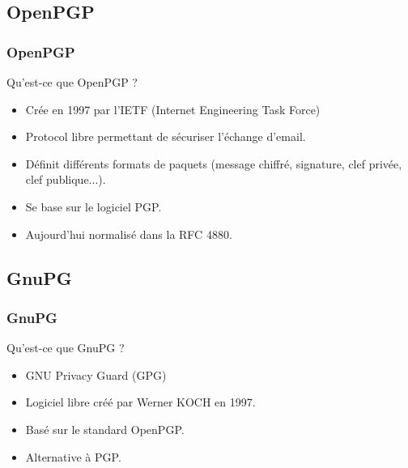 \subsection{OpenPGP}
\begin{frame}
    \frametitle{\color{white}OpenPGP}
    \begin{block}{Qu'est-ce que OpenPGP ?}
      \begin{itemize}
       \item Crée en 1997 par l'IETF (Internet Engineering Task Force)
       \item Protocol libre permettant de sécuriser l'échange d'email.
       \item Définit différents formats de paquets (message chiffré, signature, clef privée, clef publique...).
       \item Se base sur le logiciel PGP.
         \item Aujourd'hui normalisé dans la RFC 4880.
       \end{itemize} 
    \end{block}
\end{frame}

\subsection{GnuPG}
\begin{frame}
    \frametitle{\color{white}GnuPG}
    \begin{block}{Qu'est-ce que GnuPG ?}
      \begin{itemize}
        \item GNU Privacy Guard (GPG)
        \item Logiciel libre créé par Werner KOCH en 1997.
        \item Basé sur le standard OpenPGP.
        \item Alternative à PGP.
      \end{itemize}
    \end{block}
\end{frame}